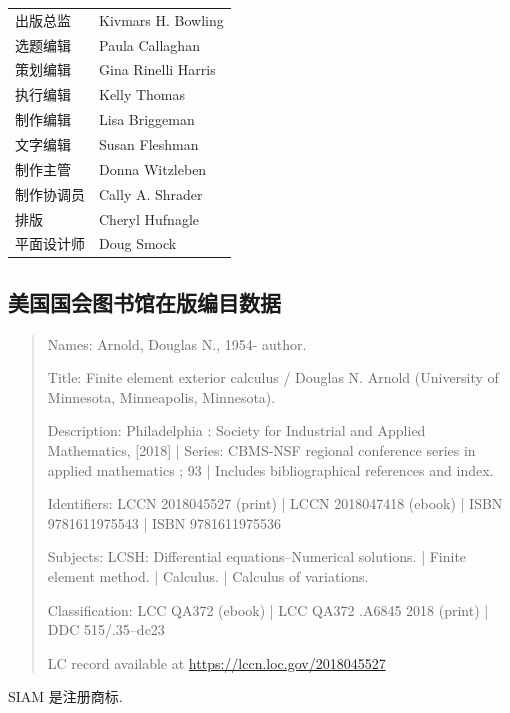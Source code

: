 \begin{center}\begin{tabular}{ll}
出版总监&Kivmars H. Bowling\\
选题编辑&Paula Callaghan\\
策划编辑&Gina Rinelli Harris\\
执行编辑&Kelly Thomas\\
制作编辑&Lisa Briggeman\\
文字编辑&Susan Fleshman\\
制作主管&Donna Witzleben\\
制作协调员&Cally A. Shrader\\
排版&Cheryl Hufnagle\\
平面设计师&Doug Smock
\end{tabular}\end{center}

\subsection*{美国国会图书馆在版编目数据}
\begin{quote}\small
Names: Arnold, Douglas N., 1954- author.\par
Title: Finite element exterior calculus / Douglas N. Arnold (University of Minnesota, Minneapolis, Minnesota).\par
Description: Philadelphia : Society for Industrial and Applied Mathematics, [2018] | Series: CBMS-NSF regional conference series in applied mathematics ; 93 | Includes bibliographical references and index.\par
Identifiers: LCCN 2018045527 (print) | LCCN 2018047418 (ebook) \newline | ISBN 9781611975543 | ISBN 9781611975536\par
Subjects: LCSH: Differential equations--Numerical solutions. | Finite element method. | Calculus. | Calculus of variations.\par
Classification: LCC QA372 (ebook) | LCC QA372 .A6845 2018 (print) | DDC 515/.35--dc23\par
LC record available at \url{https://lccn.loc.gov/2018045527}
\end{quote}

SIAM 是注册商标.
\clearpage
